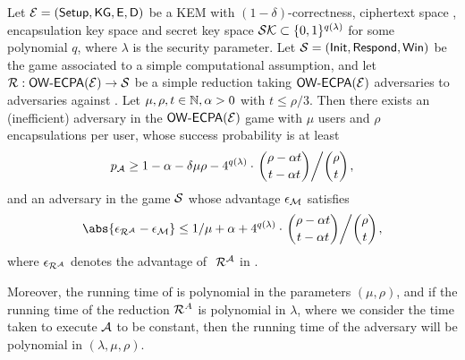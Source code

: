 \begin{remark}
\end{remark}

\begin{theorem}\label{thm:owecpa}
  Let \(\mathcal{E} = (\mathsf{Setup}, \mathsf{KG}, \mathsf{E}, \mathsf{D})\) be a KEM
  with \((1-\delta)\)-correctness,
  ciphertext space \setC, encapsulation key space \keyspace
  and secret key space \(\mathcal{SK} \subset \{0,1\}^{q(\lambda)}\) for some polynomial \(q\),
  where \(\lambda\) is the security parameter.
  Let \(\mathcal{S} = (\mathsf{Init}, \mathsf{Respond}, \mathsf{Win})\) be the game associated to a simple computational assumption,
  and let \(\redR : \OWECPA(\KEM) \to \Simple\) be a simple reduction
  taking \(\mathsf{OW}\text{-}\mathsf{ECPA}(\mathcal{E})\) adversaries to adversaries against \Simple.
  Let \(\mu,\rho,t \in \mathbb{N}, \alpha > 0\) with \(t \le \rho/3\).
  Then there exists an (inefficient) adversary \advA in the \(\mathsf{OW}\text{-}\mathsf{ECPA}(\mathcal{E})\) game
  with \(\mu\) users and \(\rho\) encapsulations per user,
  whose success probability is at least
  \begin{equation}\label{ineq:A}
    p_{\advA} \ge 1 - \alpha - \delta \mu \rho
    - 4^{q(\lambda)} \cdot \left. \binom{\rho - \alpha t}{t - \alpha t} \middle/ \binom{\rho}{t} \right.,
  \end{equation}
  and an adversary \redM in the game \(\mathcal{S}\)
  whose advantage \(\epsilon_{\mathcal{M}}\) satisfies
  \begin{equation}\label{ineq:M}
    \abs{\epsilon_{\redR^{\advA}} - \epsilon_{\redM}} \le 1/\mu + \alpha
    + 4^{q(\lambda)} \cdot \left. \binom{\rho - \alpha t}{t - \alpha t} \middle/ \binom{\rho}{t} \right.,
  \end{equation}
  where \(\epsilon_{\redR^{\advA}}\) denotes the advantage of \(\text{ }\redR^{\advA}\) in \Simple.

  Moreover, the running time of \redM is polynomial in the parameters \((\mu, \rho)\),
  and if the running time of the reduction \(\redR^{A}\) is polynomial in \(\lambda\),
  where we consider the time taken to execute \(\mathcal{A}\) to be constant,
  then the running time of the adversary \redM will be polynomial in \((\lambda,\mu,\rho)\).
\end{theorem}

\begin{corollary}
\end{corollary}

